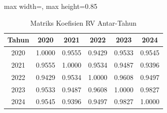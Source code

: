 \begin{table}[H]
\centering
\caption{Matriks Koefisien RV Antar-Tahun} \label{tab:rv}
\begin{adjustbox}{max width=\textwidth, max height=0.85\textheight}
\begin{tabular}{|c|c|c|c|c|c|}
\hline
\textbf{Tahun} & \textbf{2020} & \textbf{2021} & \textbf{2022} & \textbf{2023} & \textbf{2024} \\
\hline
2020 & 1.0000 & 0.9555 & 0.9429 & 0.9533 & 0.9545 \\
2021 & 0.9555 & 1.0000 & 0.9534 & 0.9487 & 0.9396 \\
2022 & 0.9429 & 0.9534 & 1.0000 & 0.9608 & 0.9497 \\
2023 & 0.9533 & 0.9487 & 0.9608 & 1.0000 & 0.9827 \\
2024 & 0.9545 & 0.9396 & 0.9497 & 0.9827 & 1.0000 \\
\hline
\end{tabular}
\end{adjustbox}
\end{table}